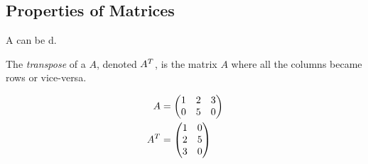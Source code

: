 \subsection{Properties of Matrices}\label{subsec:Properties_Matrices}
A  can be d.

\begin{definition}[Transpose]\label{def:Transpose}
  The \emph{transpose} of a  $A$, denoted ${A}^{T}$, is the matrix $A$ where all the columns became rows or vice-versa.

  \begin{align*}
    A &=
        \begin{pmatrix}
          1 & 2  & 3 \\
          0 & 5 & 0 \\
        \end{pmatrix} \\
    {A}^{T} &=
                    \begin{pmatrix}
                      1 & 0 \\
                      2 & 5 \\
                      3 & 0
                    \end{pmatrix}
  \end{align*}
\end{definition}

